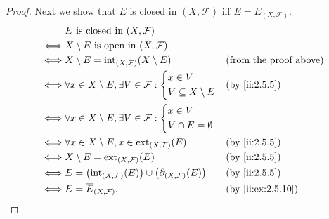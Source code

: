 \begin{proof}
  Next we show that \(E\) is closed in \((X, \mathcal{F})\) iff \(E = \overline{E}_{(X, \mathcal{F})}\).
  \begin{align*}
         & E \text{ is closed in } (X, \mathcal{F})                                                                                        \\
    \iff & X \setminus E \text{ is open in } (X, \mathcal{F})                                                                              \\
    \iff & X \setminus E = \text{int}_{(X, \mathcal{F})}(X \setminus E)                                 &  & \text{(from the proof above)} \\
    \iff & \forall x \in X \setminus E, \exists V \in \mathcal{F} : \begin{dcases}
                                                                      x \in V \\
                                                                      V \subseteq X \setminus E
                                                                    \end{dcases}                      &  & \by{ii:2.5.5}                      \\
    \iff & \forall x \in X \setminus E, \exists V \in \mathcal{F} : \begin{dcases}
                                                                      x \in V \\
                                                                      V \cap E = \emptyset
                                                                    \end{dcases}                                                    \\
    \iff & \forall x \in X \setminus E, x \in \text{ext}_{(X, \mathcal{F})}(E)                          &  & \by{ii:2.5.5}                    \\
    \iff & X \setminus E = \text{ext}_{(X, \mathcal{F})}(E)                                             &  & \by{ii:2.5.5}                    \\
    \iff & E = \big(\text{int}_{(X, \mathcal{F})}(E)\big) \cup \big(\partial_{(X, \mathcal{F})}(E)\big) &  & \by{ii:2.5.5}                    \\
    \iff & E = \overline{E}_{(X, \mathcal{F})}.                                                         &  & \by{ii:ex:2.5.10}
  \end{align*}


\end{proof}
